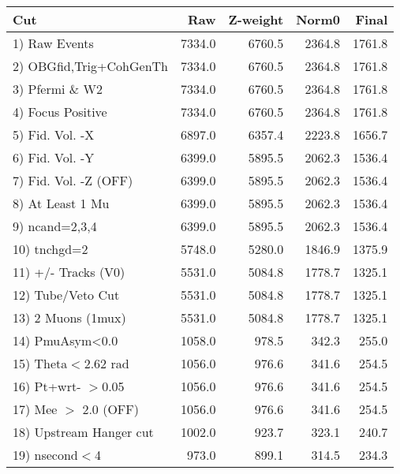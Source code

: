  \begin{table}[h!]\centering
 \begin{tabular}{||l||r|r|r|r||}
 \hline
 \hline
 Cut & Raw & Z-weight & Norm0 & Final \\
 \hline
  1) Raw Events           &      7334.0 &      6760.5 &      2364.8 &      1761.8 \\
  2) OBGfid,Trig+CohGenTh &      7334.0 &      6760.5 &      2364.8 &      1761.8 \\
  3) Pfermi \& W2         &      7334.0 &      6760.5 &      2364.8 &      1761.8 \\
  4) Focus Positive       &      7334.0 &      6760.5 &      2364.8 &      1761.8 \\
  5) Fid. Vol. -X         &      6897.0 &      6357.4 &      2223.8 &      1656.7 \\
  6) Fid. Vol. -Y         &      6399.0 &      5895.5 &      2062.3 &      1536.4 \\
  7) Fid. Vol. -Z (OFF)   &      6399.0 &      5895.5 &      2062.3 &      1536.4 \\
  8) At Least 1 Mu        &      6399.0 &      5895.5 &      2062.3 &      1536.4 \\
  9) ncand=2,3,4          &      6399.0 &      5895.5 &      2062.3 &      1536.4 \\
 10) tnchgd=2             &      5748.0 &      5280.0 &      1846.9 &      1375.9 \\
 11) +/- Tracks (V0)      &      5531.0 &      5084.8 &      1778.7 &      1325.1 \\
 12) Tube/Veto Cut        &      5531.0 &      5084.8 &      1778.7 &      1325.1 \\
 13) 2 Muons (1mux)       &      5531.0 &      5084.8 &      1778.7 &      1325.1 \\
 14) PmuAsym<0.0          &      1058.0 &       978.5 &       342.3 &       255.0 \\
 15) Theta$<$2.62 rad     &      1056.0 &       976.6 &       341.6 &       254.5 \\
 16) Pt+wrt- $>$0.05      &      1056.0 &       976.6 &       341.6 &       254.5 \\
 17) Mee $>$ 2.0  (OFF)   &      1056.0 &       976.6 &       341.6 &       254.5 \\
 18) Upstream Hanger cut  &      1002.0 &       923.7 &       323.1 &       240.7 \\
 19) nsecond$<$4          &       973.0 &       899.1 &       314.5 &       234.3 \\

\end{tabular}
\end{table}
